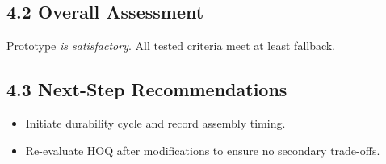 \documentclass[12pt]{article}
\begin{document}
\subsection*{4.2 Overall Assessment}
Prototype \emph{is satisfactory}. All tested criteria meet at least fallback. 

\subsection*{4.3 Next-Step Recommendations}
\begin{itemize}[leftmargin=*]
  \item Initiate durability cycle and record assembly timing.
  \item Re-evaluate HOQ after modifications to ensure no secondary trade-offs.
\end{itemize}

\end{document}
